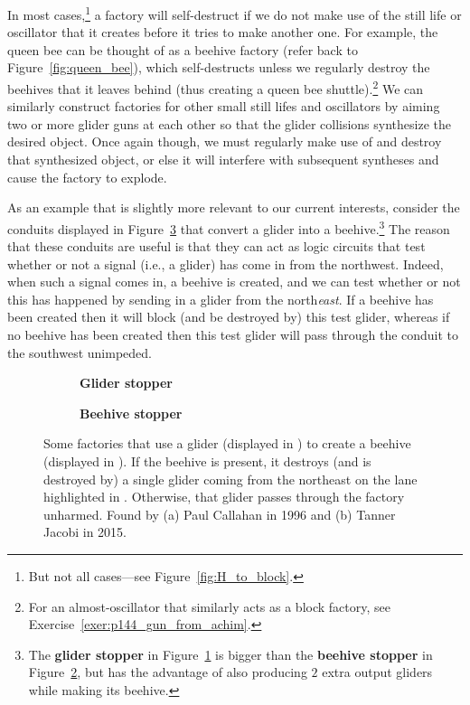 In most cases,\footnote{But not all cases---see Figure~\ref{fig:H_to_block}.} a factory will self-destruct if we do not make use of the still life or oscillator that it creates before it tries to make another one. For example, the queen bee can be thought of as a beehive factory (refer back to Figure~\ref{fig:queen_bee}), which self-destructs unless we regularly destroy the beehives that it leaves behind (thus creating a queen bee shuttle).\footnote{For an almost-oscillator that similarly acts as a block factory, see Exercise~\ref{exer:p144_gun_from_achim}.} We can similarly construct factories for other small still lifes and oscillators by aiming two or more glider guns at each other so that the glider collisions synthesize the desired object. Once again though, we must regularly make use of and destroy that synthesized object, or else it will interfere with subsequent syntheses and cause the factory to explode.

As an example that is slightly more relevant to our current interests, consider the conduits displayed in Figure~\ref{fig:glider_beehive_stopper} that convert a glider into a beehive.\footnote{The \textbf{glider stopper} in Figure~\ref{fig:glider_stopper} is bigger than the \textbf{beehive stopper} in Figure~\ref{fig:beehive_stopper}, but has the advantage of also producing $2$ extra output gliders while making its beehive.} The reason that these conduits are useful is that they can act as logic circuits that test whether or not a signal (i.e., a glider) has come in from the northwest. Indeed, when such a signal comes in, a beehive is created, and we can test whether or not this has happened by sending in a glider from the north\emph{east}. If a beehive has been created then it will block (and be destroyed by) this test glider, whereas if no beehive has been created then this test glider will pass through the conduit to the southwest unimpeded.

\begin{figure}[!htb]
	\centering
	\begin{subfigure}{.53\textwidth}
		\centering{}
		\caption{\textbf{Glider stopper}}\label{fig:glider_stopper}
	\end{subfigure} \hfill
	\begin{subfigure}{.43\textwidth}
		\centering{}
		\caption{\textbf{Beehive stopper}}\label{fig:beehive_stopper}
	\end{subfigure}
	\caption{Some factories that use a glider (displayed in ) to create a beehive (displayed in ). If the beehive is present, it destroys (and is destroyed by) a single glider coming from the northeast on the lane highlighted in . Otherwise, that glider passes through the factory unharmed. Found by (a) Paul Callahan in 1996 and (b) Tanner Jacobi in 2015.}
	\label{fig:glider_beehive_stopper}
\end{figure}

